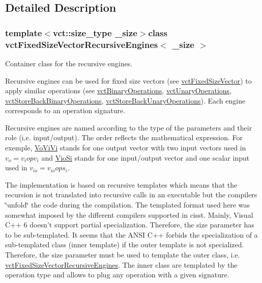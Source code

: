 \subsection{Detailed Description}
\subsubsection*{template$<$vct\-::size\-\_\-type \-\_\-size$>$class vct\-Fixed\-Size\-Vector\-Recursive\-Engines$<$ \-\_\-size $>$}

Container class for the recursive engines. 

Recursive engines can be used for fixed size vectors (see \hyperlink{classvct_fixed_size_vector}{vct\-Fixed\-Size\-Vector}) to apply similar operations (see \hyperlink{classvct_binary_operations}{vct\-Binary\-Operations}, \hyperlink{classvct_unary_operations}{vct\-Unary\-Operations}, \hyperlink{classvct_store_back_binary_operations}{vct\-Store\-Back\-Binary\-Operations}, \hyperlink{classvct_store_back_unary_operations}{vct\-Store\-Back\-Unary\-Operations}). Each engine corresponds to an operation signature.

Recursive engines are named according to the type of the parameters and their role (i.\-e. input/output). The order reflects the mathematical expression. For exemple, \hyperlink{classvct_fixed_size_vector_recursive_engines_1_1_vo_vi_vi}{Vo\-Vi\-Vi} stands for one output vector with two input vectors used in $v_o = v_i op v_i$ and \hyperlink{classvct_fixed_size_vector_recursive_engines_1_1_vio_si}{Vio\-Si} stands for one input/output vector and one scalar input used in $v_{io} = v_{io} op s_i$.

The implementation is based on recursive templates which means that the recursion is not translated into recursive calls in an executable but the compilers \char`\"{}unfold\char`\"{} the code during the compilation. The templated format used here was somewhat imposed by the different compilers supported in cisst. Mainly, Visual C++ 6 doesn't support partial specialization. Therefore, the size parameter has to be sub-\/templated. It seems that the A\-N\-S\-I C++ forbids the specialization of a sub-\/templated class (inner template) if the outer template is not specialized. Therefore, the size parameter must be used to template the outer class, i.\-e. \hyperlink{classvct_fixed_size_vector_recursive_engines}{vct\-Fixed\-Size\-Vector\-Recursive\-Engines}. The inner class are templated by the operation type and allows to plug any operation with a given signature.

